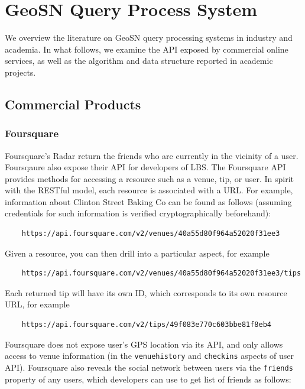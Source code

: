 \section{GeoSN Query Process System}

We overview the literature on GeoSN query processing systems in industry and academia. In what follows, we examine the API exposed by commercial online services, as well as the algorithm and data structure reported in academic projects.

\subsection{Commercial Products}
\subsubsection{Foursquare}
Foursquare’s Radar return the friends who are currently in the vicinity of a user. Foursqaure also expose their API for developers of LBS. The Foursquare API provides methods for accessing a resource such as a venue, tip, or user. In spirit with the RESTful model\cite{restful}, each resource is associated with a URL. For example, information about Clinton Street Baking Co can be found as follows (assuming credentials for such information is verified cryptographically beforehand):

\begin{verbatim}
	https://api.foursquare.com/v2/venues/40a55d80f964a52020f31ee3
\end{verbatim}

Given a resource, you can then drill into a particular aspect, for example

\begin{verbatim}
	https://api.foursquare.com/v2/venues/40a55d80f964a52020f31ee3/tips
\end{verbatim}

Each returned tip will have its own ID, which corresponds to its own resource URL, for example

\begin{verbatim}
	https://api.foursquare.com/v2/tips/49f083e770c603bbe81f8eb4
\end{verbatim}

Foursquare does not expose user's GPS location via its API, and only allows access to venue information (in the \texttt{venuehistory} and \texttt{checkins} aspects of user API). Foursquare also reveals the social network between users via the \texttt{friends} property of any users, which developers can use to get list of friends as follows:

